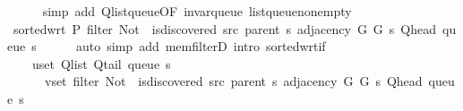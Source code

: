 \begin{isabellebody}
\ \ \ \ \isamarkupfalse%
\ {\isacharparenleft}{\kern0pt}simp\ add{\isacharcolon}{\kern0pt}\ Q{\isachardot}{\kern0pt}list{\isacharunderscore}{\kern0pt}queue{\isacharbrackleft}{\kern0pt}OF\ invar{\isacharunderscore}{\kern0pt}queue\ list{\isacharunderscore}{\kern0pt}queue{\isacharunderscore}{\kern0pt}non{\isacharunderscore}{\kern0pt}empty{\isacharbrackright}{\kern0pt}{\isacharparenright}{\kern0pt}\isanewline
\ \ \isamarkupfalse%
\ \isamarkupfalse%
\ {\isachardoublequoteopen}sorted{\isacharunderscore}{\kern0pt}wrt\ {\isacharquery}{\kern0pt}P\ {\isacharparenleft}{\kern0pt}filter\ {\isacharparenleft}{\kern0pt}Not\ {\isasymcirc}\ is{\isacharunderscore}{\kern0pt}discovered\ src\ {\isacharparenleft}{\kern0pt}parent\ s{\isacharparenright}{\kern0pt}{\isacharparenright}{\kern0pt}\ {\isacharparenleft}{\kern0pt}adjacency\ G{}\ G{}\ s\ {\isacharparenleft}{\kern0pt}Q{\isacharunderscore}{\kern0pt}head\ {\isacharparenleft}{\kern0pt}queue\ s{\isacharparenright}{\kern0pt}{\isacharparenright}{\kern0pt}{\isacharparenright}{\kern0pt}{\isacharparenright}{\kern0pt}{\isachardoublequoteclose}\isanewline
\ \ \ \ \isamarkupfalse%
\ {\isacharparenleft}{\kern0pt}auto\ simp\ add{\isacharcolon}{\kern0pt}\ mem{\isacharunderscore}{\kern0pt}filterD{\isacharparenleft}{\kern0pt}{}{\isacharparenright}{\kern0pt}\ intro{\isacharcolon}{\kern0pt}\ sorted{\isacharunderscore}{\kern0pt}wrt{\isacharunderscore}{\kern0pt}if{\isacharparenright}{\kern0pt}\isanewline
\ \ \isamarkupfalse%
\ \isamarkupfalse%
\isanewline
\ \ \ \ {\isachardoublequoteopen}{\isasymforall}u{\isasymin}set\ {\isacharparenleft}{\kern0pt}Q{\isacharunderscore}{\kern0pt}list\ {\isacharparenleft}{\kern0pt}Q{\isacharunderscore}{\kern0pt}tail\ {\isacharparenleft}{\kern0pt}queue\ s{\isacharparenright}{\kern0pt}{\isacharparenright}{\kern0pt}{\isacharparenright}{\kern0pt}{\isachardot}{\kern0pt}\isanewline
\ \ \ \ \ \ {\isasymforall}v{\isasymin}set\ {\isacharparenleft}{\kern0pt}filter\ {\isacharparenleft}{\kern0pt}Not\ {\isasymcirc}\ is{\isacharunderscore}{\kern0pt}discovered\ src\ {\isacharparenleft}{\kern0pt}parent\ s{\isacharparenright}{\kern0pt}{\isacharparenright}{\kern0pt}\ {\isacharparenleft}{\kern0pt}adjacency\ G{}\ G{}\ s\ {\isacharparenleft}{\kern0pt}Q{\isacharunderscore}{\kern0pt}head\ {\isacharparenleft}{\kern0pt}queue\ s{\isacharparenright}{\kern0pt}{\isacharparenright}{\kern0pt}{\isacharparenright}{\kern0pt}{\isacharparenright}{\kern0pt}{\isachardot}{\kern0pt}\isanewline

\end{isabellebody}
